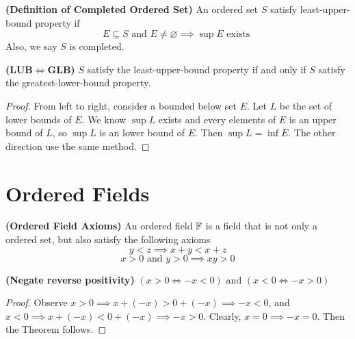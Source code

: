 \documentclass{report}
\begin{document}
\begin{definition}
\label{1.1.11}
  \textbf{(Definition of Completed Ordered Set)}
An ordered set $S$ satisfy least-upper-bound property if
 \begin{equation}
E\subseteq S\text{ and }E\neq \varnothing\implies \sup E\text{ exists }
\end{equation}
Also, we say $S$ is completed.
\end{definition}
\begin{theorem}
\label{1.1.12}
  \textbf{(LUB$\iff $GLB)} $S$ satisfy the least-upper-bound property if and only if  $S$ satisfy the greatest-lower-bound property.
\end{theorem}
\begin{proof}
  From left to right, consider a bounded below set $E$.  Let $L$ be the set of lower bounds of  $E$. We know $\sup L$ exists and every elements of $E$ is an upper bound of $L$, so $\sup L$ is an lower bound of $E$. Then $\sup L=\inf E$. The other direction use the same method. 
\end{proof}
\section{Ordered Fields}
\begin{axiom}
\label{1.2.1}
\textbf{(Ordered Field Axioms)} An ordered field $\mathbb{F}$ is a field that is not only a ordered set, but also satisfy the following axioms
\begin{equation}
y<z\implies x+y<x+z
\end{equation}
\begin{equation}
x>0\text{ and }y>0\implies xy>0
\end{equation}
\end{axiom}
\begin{theorem}
\label{1.2.2}
\textbf{(Negate reverse positivity)} $(x>0\iff -x<0)\text{ and }(x<0\iff -x>0)$
\end{theorem}
\begin{proof}
  Observe $x>0\implies x+(-x)>0+(-x)\implies -x<0$, and $x<0\implies x+(-x)<0+(-x)\implies -x>0$. Clearly, $x=0\implies -x=0$. Then the Theorem follows.
\end{proof}
\end{document}
